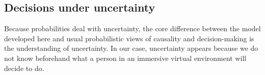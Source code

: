 \documentclass[
		twoside,openright,titlepage,numbers=noenddot,manychapters,
		headinclude,%
                footinclude=false,cleardoublepage=empty,
                BCOR=5mm,
		fontsize=11pt, %
                 enabledeprecatedfontcommands]{scrreprt}
\begin{document}

\subsection{Decisions under uncertainty}
Because probabilities deal with uncertainty, the core difference between the model developed here and usual probabilistic views of causality and decision-making is the understanding of uncertainty. In our case, uncertainty appears because we do not know beforehand what a person in an immersive virtual environment will decide to do.
\end{document}
